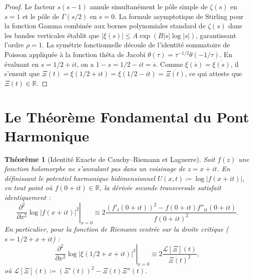 \documentclass[11pt,a4paper]{article}
\newtheorem{theorem}{Théorème}[section]
\theoremstyle{definition}
\theoremstyle{remark}
\begin{document}
\begin{proof}
Le facteur $s(s-1)$ annule simultanément le pôle simple de $\zeta(s)$ en $s=1$ et le pôle de $\Gamma(s/2)$ en $s=0$. La formule asymptotique de Stirling pour la fonction Gamma combinée aux bornes polynomiales standard de $\zeta(s)$ dans les bandes verticales établit que $|\xi(s)| \le A \exp(B |s| \log |s|)$, garantissant l'ordre $\rho = 1$. La symétrie fonctionnelle découle de l'identité sommatoire de Poisson appliquée à la fonction thêta de Jacobi $\theta(\tau) = \tau^{-1/2}\theta(-1/\tau)$. En évaluant en $s = 1/2 + it$, on a $1 - s = 1/2 - it = \overline{s}$. Comme $\xi(\overline{s}) = \overline{\xi(s)}$, il s'ensuit que $\Xi(t) = \xi(1/2 + it) = \xi(1/2 - it) = \overline{\Xi(t)}$, ce qui atteste que $\Xi(t) \in \mathbb{R}$.
\end{proof}

\section{Le Théorème Fondamental du Pont Harmonique}

\begin{theorem}[Identité Exacte de Cauchy--Riemann et Laguerre]
\label{thm:puente_armonico_experto}
Soit $f(z)$ une fonction holomorphe ne s'annulant pas dans un voisinage de $z = x + it$. En définissant le potentiel harmonique bidimensionnel $U(x, t) \coloneqq \log |f(x + it)|$, en tout point où $f(0 + it) \in \mathbb{R}$, la dérivée seconde transversale satisfait identiquement :
\begin{equation}
\left.\frac{\partial^2}{\partial x^2}\log |f(x + it)|^2\right|_{x=0} \equiv 2 \frac{(f'_t(0+it))^2 - f(0+it) f''_{tt}(0+it)}{f(0+it)^2}.
\end{equation}
En particulier, pour la fonction de Riemann centrée sur la droite critique ($s = 1/2 + x + it$) :
\begin{equation}
\left.\frac{\partial^2}{\partial x^2}\log |\xi(1/2 + x + it)|^2\right|_{x=0} \equiv 2 \frac{\mathcal{L}[\Xi](t)}{\Xi(t)^2},
\end{equation}
où $\mathcal{L}[\Xi](t) \coloneqq (\Xi'(t))^2 - \Xi(t)\Xi''(t)$.
\end{theorem}
\end{document}

